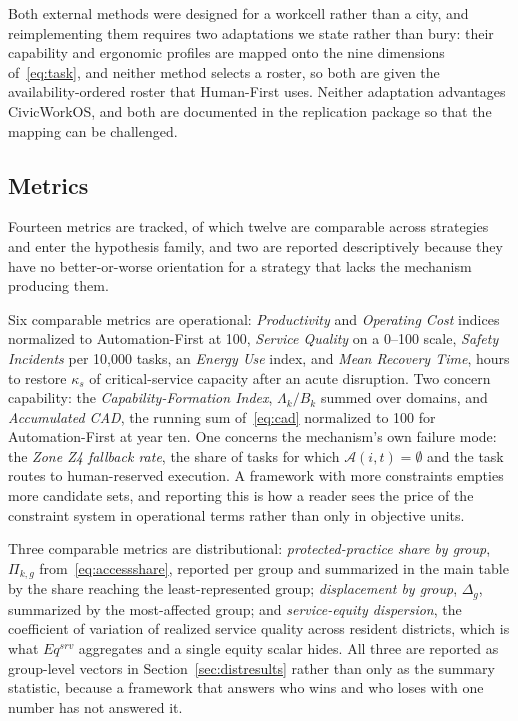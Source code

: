 	Both external methods were designed for a workcell rather than a city, and reimplementing them requires two adaptations we state rather than bury: their capability and ergonomic profiles are mapped onto the nine dimensions of~\eqref{eq:task}, and neither method selects a roster, so both are given the availability-ordered roster that Human-First uses. Neither adaptation advantages CivicWorkOS, and both are documented in the replication package so that the mapping can be challenged.
	
	\subsection{Metrics}
	\label{sec:metrics}
	
	Fourteen metrics are tracked, of which twelve are comparable across strategies and enter the hypothesis family, and two are reported descriptively because they have no better-or-worse orientation for a strategy that lacks the mechanism producing them.
	
	Six comparable metrics are operational: \textit{Productivity} and \textit{Operating Cost} indices normalized to Automation-First at 100, \textit{Service Quality} on a 0--100 scale, \textit{Safety Incidents} per 10{,}000 tasks, an \textit{Energy Use} index, and \textit{Mean Recovery Time}, hours to restore $\kappa_s$ of critical-service capacity after an acute disruption. Two concern capability: the \textit{Capability-Formation Index}, $\Lambda_k/B_k$ summed over domains, and \textit{Accumulated CAD}, the running sum of~\eqref{eq:cad} normalized to 100 for Automation-First at year ten. One concerns the mechanism's own failure mode: the \textit{Zone Z4 fallback rate}, the share of tasks for which $\mathcal{A}(i,t)=\emptyset$ and the task routes to human-reserved execution. A framework with more constraints empties more candidate sets, and reporting this is how a reader sees the price of the constraint system in operational terms rather than only in objective units.
	
	Three comparable metrics are distributional: \textit{protected-practice share by group}, $\Pi_{k,g}$ from~\eqref{eq:accessshare}, reported per group and summarized in the main table by the share reaching the least-represented group; \textit{displacement by group}, $\Delta_g$, summarized by the most-affected group; and \textit{service-equity dispersion}, the coefficient of variation of realized service quality across resident districts, which is what $Eq^{srv}$ aggregates and a single equity scalar hides. All three are reported as group-level vectors in Section~\ref{sec:distresults} rather than only as the summary statistic, because a framework that answers who wins and who loses with one number has not answered it.
	
